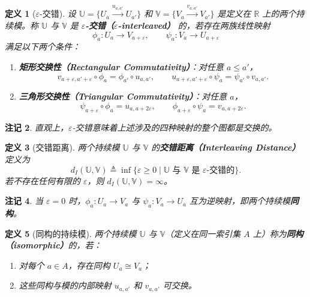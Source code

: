 \documentclass[UTF8]{ctexart}
\newtheorem{definition}{定义}[section]
\newtheorem{remark}[definition]{注记}
\begin{document}
\begin{definition}[\(\varepsilon\)-交错]
\label{def:interleaving}
设 \(\mathbb{U} = \{U_a \xrightarrow{u_{a,a'}} U_{a'}\}\) 和 \(\mathbb{V} = \{V_a \xrightarrow{v_{a,a'}} V_{a'}\}\) 是定义在 \(\mathbb{R}\) 上的两个持续模。称 \(\mathbb{U}\) 与 \(\mathbb{V}\) 是 \textbf{\(\varepsilon\)-交错（\(\varepsilon\)-interleaved）} 的，若存在两族线性映射
\[
\phi_a: U_a \to V_{a+\varepsilon}, \qquad \psi_a: V_a \to U_{a+\varepsilon}
\]
满足以下两个条件：

\begin{enumerate}
    \item \textbf{矩形交换性（Rectangular Commutativity）}：对任意 \(a \le a'\)，
    \[
    v_{a+\varepsilon, a'+\varepsilon} \circ \phi_a = \phi_{a'} \circ u_{a,a'}, \qquad
    u_{a+\varepsilon, a'+\varepsilon} \circ \psi_a = \psi_{a'} \circ v_{a,a'}.
    \]

    \item \textbf{三角形交换性（Triangular Commutativity）}：对任意 \(a\)，
    \[
    \psi_{a+\varepsilon} \circ \phi_a = u_{a, a+2\varepsilon}, \qquad
    \phi_{a+\varepsilon} \circ \psi_a = v_{a, a+2\varepsilon}.
    \]
\end{enumerate}
\end{definition}

\begin{remark}
直观上，\(\varepsilon\)-交错意味着上述涉及的四种映射的整个图都是交换的。
\end{remark}

\begin{definition}[交错距离]
\label{def:interleaving-distance}
两个持续模 \(\mathbb{U}\) 与 \(\mathbb{V}\) 的\textbf{交错距离（Interleaving Distance）}定义为
\[
d_I(\mathbb{U}, \mathbb{V}) \triangleq \inf \{ \varepsilon \ge 0 \mid \mathbb{U} \text{ 与 } \mathbb{V} \text{ 是 } \varepsilon\text{-交错的} \}.
\]
若不存在任何有限的 \(\varepsilon\)，则 \(d_I(\mathbb{U}, \mathbb{V}) = \infty\)。
\end{definition}

\begin{remark}
当 \(\varepsilon = 0\) 时，\(\phi_a: U_a \to V_a\) 与 \(\psi_a: V_a \to U_a\) 互为逆映射，即两个持续模\textbf{同构}。
\end{remark}

\begin{definition}[同构的持续模]
\label{def:isomorphic-modules}
两个持续模 \(\mathbb{U}\) 与 \(\mathbb{V}\)（定义在同一索引集 \(A\) 上）称为\textbf{同构（isomorphic）}的，若：
\begin{enumerate}
    \item 对每个 \(a \in A\)，存在同构 \(U_a \cong V_a\)；
    \item 这些同构与模的内部映射 \(u_{a,a'}\) 和 \(v_{a,a'}\) 可交换。
\end{enumerate}
\end{definition}
\end{document}

